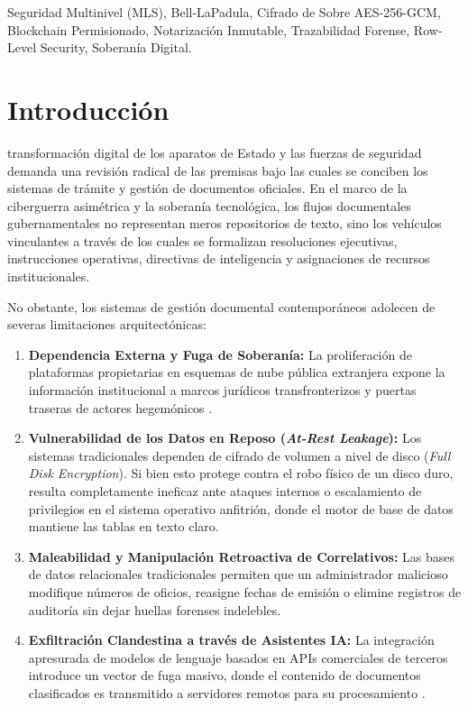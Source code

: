 \documentclass[journal,10pt]{IEEEtran}
\begin{document}
\begin{IEEEkeywords}
Seguridad Multinivel (MLS), Bell-LaPadula, Cifrado de Sobre AES-256-GCM, Blockchain Permisionado, Notarización Inmutable, Trazabilidad Forense, Row-Level Security, Soberanía Digital.
\end{IEEEkeywords}

\section{Introducción}
 transformación digital de los aparatos de Estado y las fuerzas de seguridad demanda una revisión radical de las premisas bajo las cuales se conciben los sistemas de trámite y gestión de documentos oficiales. En el marco de la ciberguerra asimétrica y la soberanía tecnológica, los flujos documentales gubernamentales no representan meros repositorios de texto, sino los vehículos vinculantes a través de los cuales se formalizan resoluciones ejecutivas, instrucciones operativas, directivas de inteligencia y asignaciones de recursos institucionales. 

No obstante, los sistemas de gestión documental contemporáneos adolecen de severas limitaciones arquitectónicas:
\begin{enumerate}
    \item \textbf{Dependencia Externa y Fuga de Soberanía:} La proliferación de plataformas propietarias en esquemas de nube pública extranjera expone la información institucional a marcos jurídicos transfronterizos y puertas traseras de actores hegemónicos \cite{nist_sp800_207_zerotrust}.
    \item \textbf{Vulnerabilidad de los Datos en Reposo (\textit{At-Rest Leakage}):} Los sistemas tradicionales dependen de cifrado de volumen a nivel de disco (\textit{Full Disk Encryption}). Si bien esto protege contra el robo físico de un disco duro, resulta completamente ineficaz ante ataques internos o escalamiento de privilegios en el sistema operativo anfitrión, donde el motor de base de datos mantiene las tablas en texto claro.
    \item \textbf{Maleabilidad y Manipulación Retroactiva de Correlativos:} Las bases de datos relacionales tradicionales permiten que un administrador malicioso modifique números de oficios, reasigne fechas de emisión o elimine registros de auditoría sin dejar huellas forenses indelebles.
    \item \textbf{Exfiltración Clandestina a través de Asistentes IA:} La integración apresurada de modelos de lenguaje basados en APIs comerciales de terceros introduce un vector de fuga masivo, donde el contenido de documentos clasificados es transmitido a servidores remotos para su procesamiento \cite{carlini2021extracting}.
\end{enumerate}
\end{document}
